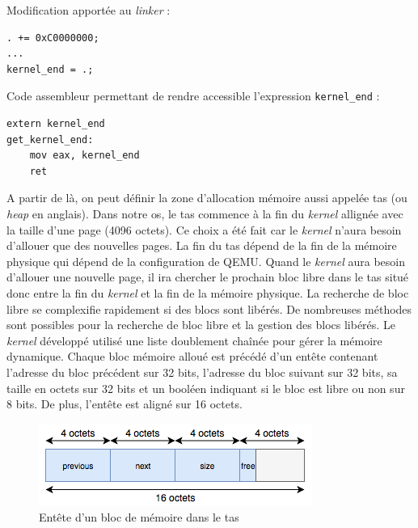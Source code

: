 Modification apportée au \textit{linker} :
\begin{verbatim}
. += 0xC0000000;
...
kernel_end = .;
\end{verbatim}

Code assembleur permettant de rendre accessible l'expression \texttt{kernel_end} :
\begin{verbatim}
extern kernel_end
get_kernel_end:
    mov eax, kernel_end
    ret
\end{verbatim}

A partir de là, on peut définir la zone d'allocation mémoire aussi appelée tas
(ou \textit{heap} en anglais). Dans notre \acrshort{os}, le tas commence à la
fin du \textit{kernel} allignée avec la taille d'une page (4096 octets). Ce choix
a été fait car le \textit{kernel} n'aura besoin d'allouer que des nouvelles
pages. La fin du tas dépend de la fin de la mémoire physique qui dépend de la
configuration de QEMU. Quand le \textit{kernel} aura besoin d'allouer une nouvelle
page, il ira chercher le prochain bloc libre dans le tas situé donc entre la fin
du \textit{kernel} et la fin de la mémoire physique. La recherche de bloc libre
se complexifie rapidement si des blocs sont libérés. De nombreuses méthodes sont
possibles pour la recherche de bloc libre et la gestion des blocs libérés. Le
\textit{kernel} développé utilisé une liste doublement chaînée pour gérer la
mémoire dynamique. Chaque bloc mémoire alloué est précédé d'un entête contenant
l'adresse du bloc précédent sur 32 bits, l'adresse du bloc suivant sur 32 bits,
sa taille en octets sur 32 bits et un booléen indiquant si le bloc est libre ou
non sur 8 bits. De plus, l'entête est aligné sur 16 octets.

\begin{figure}[!h]
  \centering
  \includegraphics[scale=0.7]{images/heap_header.png}
  \caption{Entête d'un bloc de mémoire dans le tas}
  \label{heap_header}
\end{figure}

